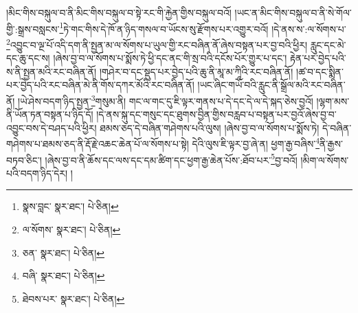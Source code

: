 །མིང་གིས་བསྐུལ་བ་ནི་མིང་གིས་བསྐུལ་བ་སྟེ་རང་གི་རྐྱེན་གྱིས་བསྐུལ་བའོ། །ཡང་ན་མིང་གིས་བསྐུལ་བ་ནི་སེ་གོལ་གྱི་:སྒྲས་བསླངས་\footnote{སྣས་བླང་  སྣར་ཐང་།  པེ་ཅིན། }ཏེ་གང་གིས་དེ་ཁོ་ན་ཉིད་གསལ་བ་ཡོངས་སུ་རྫོགས་པར་འགྱུར་བའོ། །དེ་ནས་ས་:ལ་སོགས་པ་\footnote{ལ་སོགས་  སྣར་ཐང་།  པེ་ཅིན། }འབྱུང་བ་ལྔ་པོ་འདི་དག་ནི་སྤྱན་མ་ལ་སོགས་པ་ཡུལ་གྱི་རང་བཞིན་ནོ་ཞེས་བསྟན་པར་བྱ་བའི་ཕྱིར། རླུང་དང་མེ་དང་ཆུ་དང་ས། །ཞེས་བྱ་བ་ལ་སོགས་པ་སྨོས་ཏེ་ཕྱི་དང་ནང་གི་སྲ་བའི་དངོས་པོར་གྱུར་པ་དང་། རྟེན་པར་བྱེད་པའི་ས་ནི་སྤྱན་མའི་རང་བཞིན་ནོ། །གཤེར་བ་དང་སྡུད་པར་བྱེད་པའི་ཆུ་ནི་མཱ་མ་ཀཱིའི་རང་བཞིན་ནོ། །ཚ་བ་དང་སྨིན་པར་བྱེད་པའི་རང་བཞིན་མེ་ནི་གོས་དཀར་མོའི་རང་བཞིན་ནོ། །ཡང་ཞིང་གཡོ་བའི་རླུང་ནི་སྒྲོལ་མའི་རང་བཞིན་ནོ། །ཡེ་ཤེས་བདག་ཉིད་སྤྱན་\footnote{ཅན་  སྣར་ཐང་།  པེ་ཅིན། }གསུམ་ནི། གང་ལ་གང་དུ་ཇི་ལྟར་གནས་པ་དེ་དང་དེ་ལ་དེ་སྐད་ཅེས་བྱའོ། །ལྷག་མས་ནི་ཡོན་ཏན་བསྟན་པ་ཉིད་དོ། །དེ་ནས་སྐུ་དང་གསུང་དང་ཐུགས་བྱིན་གྱིས་བརླབ་པ་བསྟན་པར་བྱའོ་ཞེས་བྱ་བ་འབྱུང་བས་དེ་བཤད་པའི་ཕྱིར། ཐམས་ཅད་དེ་བཞིན་གཤེགས་པའི་ལུས། །ཞེས་བྱ་བ་ལ་སོགས་པ་སྨོས་ཏེ། དེ་བཞིན་གཤེགས་པ་ཐམས་ཅད་ནི་རྡོ་རྗེ་འཆང་ཆེན་པོ་ལ་སོགས་པ་སྟེ། དེའི་ལུས་ཇི་ལྟར་བྱ་ཞེ་ན། ཕྱག་རྒྱ་བཞིས་\footnote{བཞི་  སྣར་ཐང་།  པེ་ཅིན། }ནི་རྒྱས་བཏབ་ཅིང་། །ཞེས་བྱ་བ་ནི་ཆོས་དང་ལས་དང་དམ་ཚིག་དང་ཕྱག་རྒྱ་ཆེན་པོས་:ཐོབ་པར་\footnote{ཐེབས་པར་  སྣར་ཐང་།  པེ་ཅིན། }བྱ་བའོ། །མིག་ལ་སོགས་པའི་བདག་ཉིད་དེར། །
